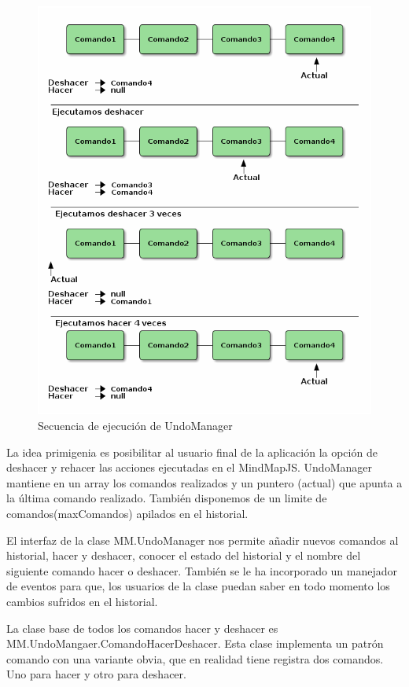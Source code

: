 \begin{figure}[tbph]
\centering
\includegraphics[width=0.7\linewidth]{imagenes/undomangerEjecucion.png}
\caption{Secuencia de ejecución de UndoManager}
\label{fig:undomanager-ejecucion}
\end{figure}

La idea primigenia es posibilitar al usuario final de la aplicación la opción de deshacer y rehacer las acciones ejecutadas en el MindMapJS. UndoManager mantiene en un array los comandos realizados y un puntero (actual) que apunta a la última comando realizado. También disponemos de un limite de comandos(maxComandos) apilados en el historial. 

El interfaz de la clase MM.UndoManager nos permite añadir nuevos comandos al historial, hacer y deshacer, conocer el estado del historial y el nombre del siguiente comando hacer o deshacer. También se le ha incorporado un manejador de eventos para que, los usuarios de la clase puedan saber en todo momento los cambios sufridos en el historial.



La clase base de todos los comandos hacer y deshacer es MM.UndoMangaer.ComandoHacerDeshacer. Esta clase implementa un patrón comando con una variante obvia, que en realidad tiene registra dos comandos. Uno para hacer y otro para deshacer. 



